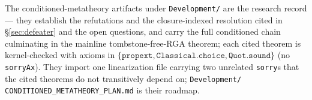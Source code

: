 \documentclass[11pt]{article}
\newcommand{\lean}[1]{\texttt{#1}}
\begin{document}
The conditioned-metatheory artifacts under \lean{Development/} are the
research record --- they establish the refutations and the
closure-indexed resolution cited in \S\ref{sec:defeater} and the open
questions, and carry the full conditioned chain culminating in the
mainline tombstone-free-RGA theorem; each cited theorem is kernel-checked
with axioms in $\{\lean{propext},
\lean{Classical.choice}, \lean{Quot.sound}\}$ (no \lean{sorryAx}). They
import one linearization file carrying two unrelated \lean{sorry}s that the
cited theorems do not transitively depend on; \lean{Development/}%
\lean{CONDITIONED\_METATHEORY\_PLAN.md} is their roadmap.
\end{document}

